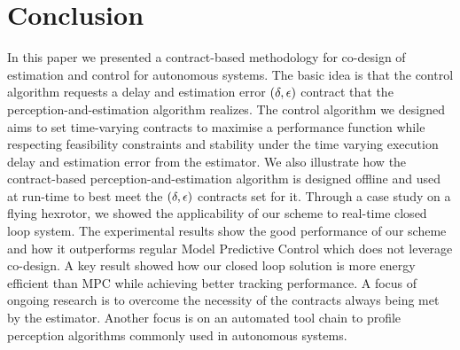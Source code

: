\section{Conclusion}
\label{conclusion}

In this paper we presented a contract-based methodology for co-design of estimation and control for autonomous systems. 
The basic idea is that the control algorithm requests a delay and estimation error $(\delta,\epsilon)$ contract that the perception-and-estimation algorithm realizes. The control algorithm we designed aims to set time-varying contracts to maximise a performance function while respecting feasibility constraints and stability under the time varying execution delay and estimation error from the estimator. We also illustrate how the contract-based perception-and-estimation algorithm is designed offline and used at run-time to best meet the $(\delta,\epsilon)$ contracts set for it. Through a case study on a flying hexrotor, we showed the applicability of our scheme to real-time closed loop system. The experimental results show the good performance of our scheme and how it outperforms regular Model Predictive Control which does not leverage co-design. A key result showed how our closed loop solution is more energy efficient than MPC while achieving better tracking performance. A focus of ongoing research is to overcome the necessity of the contracts always being met by the estimator. Another focus is on an automated tool chain to profile perception algorithms commonly used in autonomous systems.